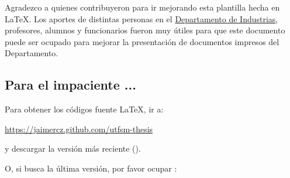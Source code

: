
	Agradezco a quienes contribuyeron para ir mejorando esta plantilla hecha en \LaTeX{}. Los aportes de distintas personas en el \href{http://www.industrias.usm.cl}{Departamento de Industrias}, profesores, alumnos y funcionarios fueron muy útiles para que este documento puede ser ocupado para mejorar la presentación de documentos impresos del Departamento.

\subsection*{\color{red}Para el impaciente ...}

Para obtener los códigos fuente \LaTeX{}, ir a:
	
	\url{https://jaimercz.github.com/utfsm-thesis}
	
y descargar la versión más reciente ().
    
O, si busca la última versión, por favor ocupar :
	

